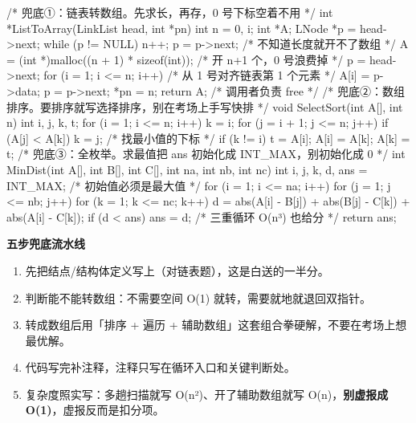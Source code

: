 \documentclass[10pt,a4paper]{ctexart}
\begin{document}
\begin{codebox}
/* 兜底①：链表转数组。先求长，再存，0 号下标空着不用 */
int *ListToArray(LinkList head, int *pn) {
    int n = 0, i;
    int *A;
    LNode *p = head->next;
    while (p != NULL) { n++; p = p->next; }     /* 不知道长度就开不了数组 */
    A = (int *)malloc((n + 1) * sizeof(int));   /* 开 n+1 个，0 号浪费掉 */
    p = head->next;
    for (i = 1; i <= n; i++) {                  /* 从 1 号对齐链表第 1 个元素 */
        A[i] = p->data;
        p = p->next;
    }
    *pn = n;
    return A;                                   /* 调用者负责 free */
}
/* 兜底②：数组排序。要排序就写选择排序，别在考场上手写快排 */
void SelectSort(int A[], int n) {
    int i, j, k, t;
    for (i = 1; i <= n; i++) {
        k = i;
        for (j = i + 1; j <= n; j++)
            if (A[j] < A[k]) k = j;             /* 找最小值的下标 */
        if (k != i) { t = A[i]; A[i] = A[k]; A[k] = t; }
    }
}
/* 兜底③：全枚举。求最值把 ans 初始化成 INT_MAX，别初始化成 0 */
int MinDist(int A[], int B[], int C[], int na, int nb, int nc) {
    int i, j, k, d, ans = INT_MAX;              /* 初始值必须是最大值 */
    for (i = 1; i <= na; i++)
      for (j = 1; j <= nb; j++)
        for (k = 1; k <= nc; k++) {
            d = abs(A[i] - B[j]) + abs(B[j] - C[k]) + abs(A[i] - C[k]);
            if (d < ans) ans = d;               /* 三重循环 O(n³) 也给分 */
        }
    return ans;
}
\end{codebox}

\textbf{五步兜底流水线}

\begin{enumerate}

\item 先把结点/结构体定义写上（对链表题），这是白送的一半分。

\item 判断能不能转数组：不需要空间 O(1) 就转，需要就地就退回双指针。

\item 转成数组后用「排序 + 遍历 + 辅助数组」这套组合拳硬解，不要在考场上想最优解。

\item 代码写完补注释，注释只写在循环入口和关键判断处。

\item 复杂度照实写：多趟扫描就写 O(n²)、开了辅助数组就写 O(n)，\textbf{别虚报成 O(1)}，虚报反而是扣分项。

\end{enumerate}

\end{document}
